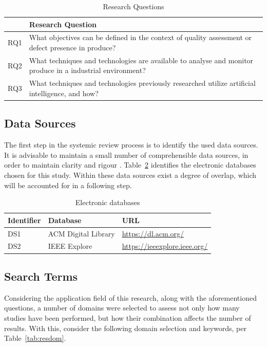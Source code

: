 \documentclass[conference]{IEEEtran}
\begin{document}
\begin{table}
    \caption{Research Questions}
    \label{tab:resquest}

    \begin{tabular}{ll}
    \hline
        & \textbf{Research Question}\\
    \hline
        RQ1 & What objectives can be defined in the context of quality assessment or defect presence in produce? \\
        RQ2 &  What techniques and technologies are available to analyse and monitor produce in a industrial environment?\\
        RQ3 & What techniques and technologies previously researched utilize artificial intelligence, and how? \\
    \hline
    \end{tabular}
\end{table}

\subsection{Data Sources}

The first step in the systemic review process is to identify the used data sources. It is advisable
to maintain a small number of comprehensible data sources, in order to maintain clarity and rigour \cite{Par2015}. Table~\ref{tab:edata} identifies the electronic databases chosen for this study. Within these data sources exist a degree of overlap, which will be accounted for in a following step.

\begin{table}
    \caption{Electronic databases}
    \label{tab:edata}

    \begin{tabular}{lll}
    \hline
        Identifier & Database & URL \\
    \hline
        DS1 & ACM Digital Library & \url{https://dl.acm.org/} \\
        DS2 & IEEE Explore & \url{https://ieeexplore.ieee.org/} \\
    \hline

    \hline
    \end{tabular}
\end{table}

\subsection{Search Terms}

Considering the application field of this research, along with the aforementioned questions, a number of domains were selected to assess not only how many studies have been performed, but how their combination affects the number of results. With this, consider the following domain selection and keywords, per Table~\ref{tab:resdom}.
\end{document}

